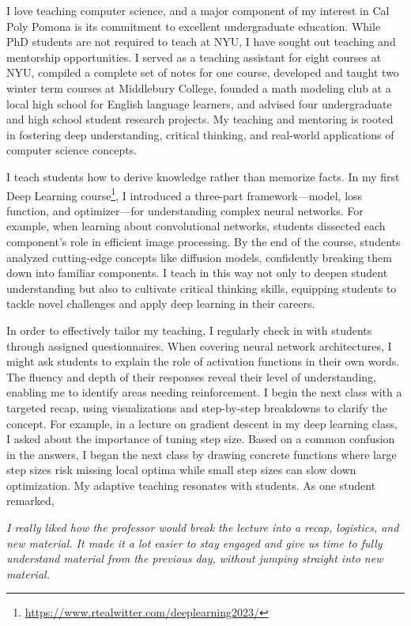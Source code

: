 \documentclass[11pt]{article}
\begin{document}
{\setlength{\parindent}{0cm}

I love teaching computer science, and a major component of my interest in Cal Poly Pomona is its commitment to excellent undergraduate education. While PhD students are not required to teach at NYU, I have sought out teaching and mentorship opportunities. I served as a teaching assistant for eight courses at NYU, compiled a complete set of notes for one course, developed and taught two winter term courses at Middlebury College, founded a math modeling club at a local high school for English language learners, and advised four undergraduate and high school student research projects. My teaching and mentoring is rooted in fostering deep understanding, critical thinking, and real-world applications of computer science concepts.

I teach students how to derive knowledge rather than memorize facts. In my first Deep Learning course\footnote{\url{https://www.rtealwitter.com/deeplearning2023/}}, I introduced a three-part framework—model, loss function, and optimizer—for understanding complex neural networks. For example, when learning about convolutional networks, students dissected each component’s role in efficient image processing. By the end of the course, students analyzed cutting-edge concepts like diffusion models, confidently breaking them down into familiar components. I teach in this way not only to deepen student understanding but also to cultivate critical thinking skills, equipping students to tackle novel challenges and apply deep learning in their careers.

In order to effectively tailor my teaching, I regularly check in with students through assigned questionnaires. When covering neural network architectures, I might ask students to explain the role of activation functions in their own words. The fluency and depth of their responses reveal their level of understanding, enabling me to identify areas needing reinforcement. I begin the next class with a targeted recap, using visualizations and step-by-step breakdowns to clarify the concept. For example, in a lecture on gradient descent in my deep learning class, I asked about the importance of tuning step size. Based on a common confusion in the answers, I began the next class by drawing concrete functions where large step sizes risk missing local optima while small step sizes can slow down optimization. My adaptive teaching resonates with students. As one student remarked,

\begin{displayquote}
	\textit{I really liked how the professor would break the lecture into a recap, logistics, and new material. It made it a lot easier to stay engaged and give us time to fully understand material from the previous day, without jumping straight into new material.}
\end{displayquote}

}
\end{document}
